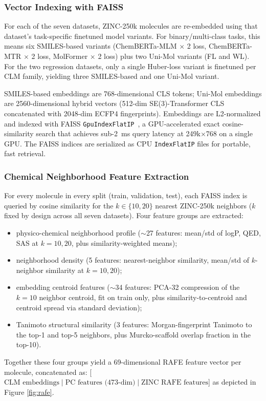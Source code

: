 \documentclass[pdflatex,sn-mathphys-num]{sn-jnl}%
\begin{document}
\subsubsection{Vector Indexing with FAISS}\label{sec:vector_faiss}
For each of the seven datasets, ZINC-250k molecules are re-embedded using that dataset's task-specific finetuned model variants. For binary/multi-class tasks, this means six SMILES-based variants (ChemBERTa-MLM $\times$ 2 loss, ChemBERTa-MTR $\times$ 2 loss, MolFormer $\times$ 2 loss) plus two Uni-Mol variants (FL and WL). For the two regression datasets, only a single Huber-loss variant is finetuned per CLM family, yielding three SMILES-based and one Uni-Mol variant.

SMILES-based embeddings are 768-dimensional CLS tokens; Uni-Mol embeddings are 2560-dimensional hybrid vectors (512-dim SE(3)-Transformer CLS concatenated with 2048-dim ECFP4 fingerprints). Embeddings are L2-normalized and indexed with FAISS \texttt{GpuIndexFlatIP}~\cite{johnson2021faiss}, a GPU-accelerated exact cosine-similarity search that achieves sub-2~ms query latency at 249k$\times$768 on a single GPU. The FAISS indices are serialized as CPU \texttt{IndexFlatIP} files for portable, fast retrieval.

\subsubsection{Chemical Neighborhood Feature Extraction}\label{sec:feature_extraction}
For every molecule in every split (train, validation, test), each FAISS index is queried by cosine similarity for the $k \in \{10, 20\}$ nearest ZINC-250k neighbors ($k$ fixed by design across all seven datasets). Four feature groups are extracted:
\begin{itemize}
  \item[\textbf{(a)}] physico-chemical neighborhood profile ($\sim$27 features: mean/std of logP, QED, SAS at $k=10,20$, plus similarity-weighted means);
  \item[\textbf{(b)}] neighborhood density (5 features: nearest-neighbor similarity, mean/std of $k$-neighbor similarity at $k=10,20$);
  \item[\textbf{(c)}] embedding centroid features ($\sim$34 features: PCA-32 compression of the $k=10$ neighbor centroid, fit on train only, plus similarity-to-centroid and centroid spread via standard deviation);
  \item[\textbf{(d)}] Tanimoto structural similarity (3 features: Morgan-fingerprint Tanimoto to the top-1 and top-5 neighbors, plus Murcko-scaffold overlap fraction in the top-10).
\end{itemize}
Together these four groups yield a 69-dimensional RAFE feature vector per molecule, concatenated as: [$\text{CLM embeddings} \mid \text{PC features (473-dim)} \mid \text{ZINC RAFE features}$] as depicted in Figure \ref{fig:rafe}.
\end{document}
